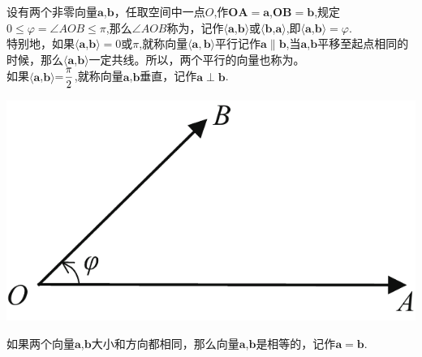 \vspace*{-1em}

\noindent
\begin{minipage}{0.5\linewidth}
\hspace*{2em} 设有两个非零向量$\boldsymbol{a}$,$\boldsymbol{b}$，任取空间中一点$O$,作$\boldsymbol{OA}=\boldsymbol{a}$,$\boldsymbol{OB}=\boldsymbol{b}$,规定$0\leq \varphi=\angle AOB\leq \pi$,那么$\angle AOB$称为，记作$\langle\boldsymbol{a}$,$\boldsymbol{b}\rangle$或$\langle\boldsymbol{b}$,$\boldsymbol{a}\rangle$,即$\langle\boldsymbol{a}$,$\boldsymbol{b}\rangle=\varphi$.\\
\hspace*{2em} 特别地，如果$\langle\boldsymbol{a}$,$\boldsymbol{b}\rangle=0$或$\pi$,就称向量$\langle\boldsymbol{a},\boldsymbol{b}
\rangle$平行记作$\boldsymbol{a}\parallel\boldsymbol{b}$,当$\boldsymbol{a}$,$\boldsymbol{b}$平移至起点相同的时候，那么$\langle\boldsymbol{a}$,$\boldsymbol{b}\rangle$一定共线。所以，两个平行的向量也称为。\\
\hspace*{2em} 如果$\langle\boldsymbol{a}$,$\boldsymbol{b}\rangle$=$\displaystyle\frac{\pi}{2}$,就称向量$\boldsymbol{a}$,$\boldsymbol{b}$垂直，记作$\boldsymbol{a}\perp\boldsymbol{b}$.
\end{minipage}
\begin{minipage}{0.5\linewidth}
	\centering
	\includegraphics[width = 0.6\linewidth]{pic/C-5/vecang}
	\vspace*{-1em}
	\label{向量的夹角}
\end{minipage}

如果两个向量$\boldsymbol{a}$,$\boldsymbol{b}$大小和方向都相同，那么向量$\boldsymbol{a}$,$\boldsymbol{b}$是相等的，记作$\boldsymbol{a}=\boldsymbol{b}$.\\

